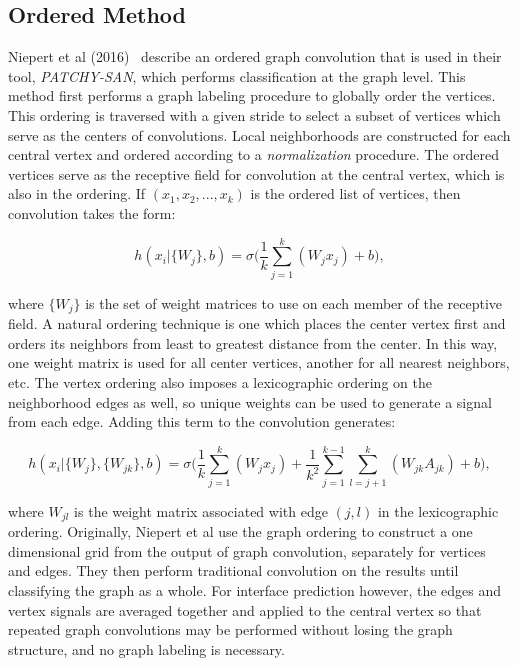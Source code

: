 \subsection{Ordered Method}

Niepert et al (2016)~\cite{niepert2016} describe an ordered graph convolution that is used in their tool, \emph{PATCHY-SAN}, which performs classification at the graph level.
This method first performs a graph labeling procedure to globally order the vertices.
This ordering is traversed with a given stride to select a subset of vertices which serve as the centers of convolutions.
Local neighborhoods are constructed for each central vertex and ordered according to a \emph{normalization} procedure.
The ordered vertices serve as the receptive field for convolution at the central vertex, which is also in the ordering. 
If $(x_1, x_2, ... , x_k)$ is the ordered list of vertices, then convolution takes the form:

\begin{equation}
h(x_i | \{ W_{j} \}, b)= \sigma \bigg( \frac{1}{k} \sum_{j=1}^{k}(W_{j} x_j) + b \bigg),
\label{eq:patchysan}
\end{equation}

\noindent
where $\{W_j\}$ is the set of weight matrices to use on each member of the receptive field.
A natural ordering technique is one which places the center vertex first and orders its neighbors from least to greatest distance from the center. 
In this way, one weight matrix is used for all center vertices, another for all nearest neighbors, etc.
The vertex ordering also imposes a lexicographic ordering on the neighborhood edges as well, so unique weights can be used to generate a signal from each edge. 
Adding this term to the convolution generates:

\begin{equation}
h(x_i | \{ W_{j} \}, \{ W_{jk} \}, b)= \sigma \bigg( \frac{1}{k} \sum_{j=1}^{k}(W_{j} x_j) + \frac{1}{k^2} \sum_{j = 1}^{k-1} \sum_{l=j+1}^{k}(W_{jk} A_{jk})  + b \bigg),
\label{eq:patchysan_2e}
\end{equation}

\noindent
where $W_{jl}$ is the weight matrix associated with edge $(j, l)$ in the lexicographic ordering.
Originally, Niepert et al use the graph ordering to construct a one dimensional grid from the output of graph convolution, separately for vertices and edges.
They then perform traditional convolution on the results until classifying the graph as a whole.
For interface prediction however, the edges and vertex signals are averaged together and applied to the central vertex so that repeated graph convolutions may be performed without losing the graph structure, and no graph labeling is necessary.


